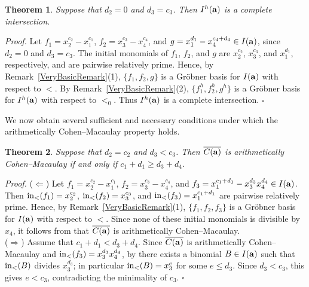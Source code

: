 \documentclass[10pt]{amsart}
\newtheorem{thm1}{Theorem}[section]
\begin{document}
\begin{thm1} \label{CI23} Suppose that $d_2=0$ and $d_{3}=c_{3}$. Then $I^{h}({\bf a})$ is a complete intersection.
\end{thm1}
{\em \noindent Proof.} Let
$f_1=x_2^{c_2}-x_1^{c_1}$,
$f_2=x_3^{c_3}-x_4^{c_4}$,
and
$g=x_1^{d_1}-x_4^{c_4+d_4}\in I({\bf a})$,
since $d_2=0$ and $d_3=c_3$.
The initial monomials of $f_1$, $f_2$, and $g$ are
$x_2^{c_2}$,
$x_3^{c_3}$,
and
$x_1^{d_1}$,
respectively, and are pairwise relatively prime.
Hence, by Remark~\ref{VeryBasicRemark}(1),
$\{f_1,f_2,g\}$ is a Gr\"obner basis for $I({\bf a})$ with respect to $<$.
By Remark~\ref{VeryBasicRemark}(2),
$\{f_1^{h},f_2^{h},g^{h}\}$ is a Gr\"obner basis for $I^{h}({\bf a})$
with respect to $<_0$.
Thus $I^{h}({\bf a})$ is a complete intersection.
\hfill $\square$ \par\vspace{0.5\baselineskip}

We now obtain several sufficient and necessary conditions under which the arithmetically Cohen--Macaulay property holds.

\begin{thm1} \label{ACM1} Suppose that $d_2=c_2$ and $d_3<c_3$. Then $\overline{C({\bf a})}$ is arithmetically Cohen--Macaulay if and only if $c_{1}+d_{1} \geq d_{3}+d_{4}$.
\end{thm1}

{\em \noindent Proof.} ($\Leftarrow$) Let $f_{1}=x_2^{c_2}-x_1^{c_1}$, $f_{2}=x_3^{c_3}-x_4^{c_4}$, and $f_{3}=x_1^{c_1+d_{1}}-x_3^{d_3}x_4^{d_4}\in I({\bf a})$. Then ${\rm in}_{<}(f_{1})=x_2^{c_2}$, ${\rm in}_{<}(f_{2})=x_3^{c_3}$, and ${\rm in}_{<}(f_{3})=x_1^{c_1+d_1}$ are pairwise relatively prime. Hence, by Remark~\ref{VeryBasicRemark}(1), $\{f_1,f_2,f_3\}$ is a Gr\"obner basis for $I({\bf a})$ with respect to $<$. Since none of these initial monomials is divisible by $x_4$, it follows from \cite[Theorem~2.2]{HerSta} that $\overline{C({\bf a})}$ is arithmetically Cohen--Macaulay.\\
($\Rightarrow$) Assume that $c_{1}+d_{1}<d_{3}+d_{4}$. Since $\overline{C({\bf a})}$ is arithmetically Cohen--Macaulay and ${\rm in}_{<}(f_{3})=x_3^{d_{3}}x_4^{d_4}$, by \cite[Theorem 2.2]{HerSta} there exists a binomial $B \in I({\bf a})$ such that ${\rm in}_{<}(B)$ divides $x_3^{d_3}$; in particular ${\rm in}_{<}(B)=x_{3}^{e}$ for some $e \leq d_3$. Since $d_3<c_3$, this gives $e<c_3$, contradicting the minimality of $c_3$. \hfill $\square$ \par\vspace{0.5\baselineskip}
\end{document}

